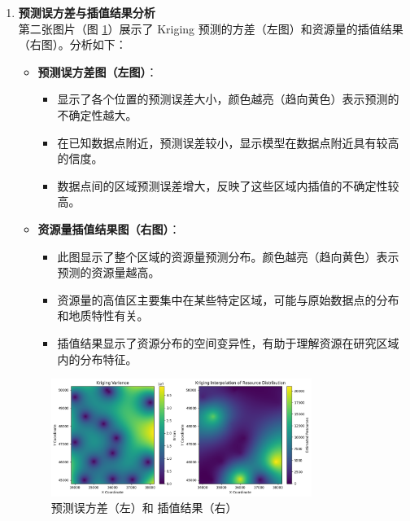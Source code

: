 \documentclass[12pt,a4paper]{nmmcm}
\begin{document}
\begin{enumerate}
  \item \textbf{预测误方差与插值结果分析} \\
        第二张图片（图 \ref{fig:KrigingInterpolation}）展示了 Kriging 预测的方差（左图）和资源量的插值结果（右图）。分析如下：
        \begin{itemize}
          \item \textbf{预测误方差图（左图）}：
                \begin{itemize}
                  \item 显示了各个位置的预测误差大小，颜色越亮（趋向黄色）表示预测的不确定性越大。
                  \item 在已知数据点附近，预测误差较小，显示模型在数据点附近具有较高的信度。
                  \item 数据点间的区域预测误差增大，反映了这些区域内插值的不确定性较高。
                \end{itemize}
          \item \textbf{资源量插值结果图（右图）}：
                \begin{itemize}
                  \item 此图显示了整个区域的资源量预测分布。颜色越亮（趋向黄色）表示预测的资源量越高。
                  \item 资源量的高值区主要集中在某些特定区域，可能与原始数据点的分布和地质特性有关。
                  \item 插值结果显示了资源分布的空间变异性，有助于理解资源在研究区域内的分布特征。
                \end{itemize}
        \end{itemize}
        \begin{figure}[h]
          \centering
          \includegraphics[width=0.8\textwidth]{figures/task4/task4-2.png}
          \caption{预测误方差（左）和 插值结果（右）}
          \label{fig:KrigingInterpolation}
        \end{figure}
\end{enumerate}
\end{document}
